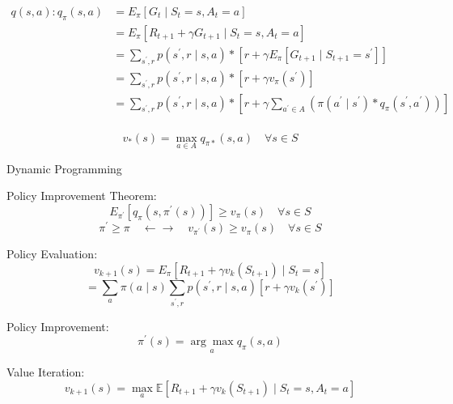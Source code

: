 \documentclass{article}
\begin{document}
\begin{align*}
q(s, a):
q_{\pi}(s, a)&=E_{\pi} \left[G_{t} \mid S_{t}=s, A_{t}=a\right] \\
&=E_{\pi} \left[R_{t+1}+\gamma G_{t+1} \mid S_{t}=s, A_{t}=a\right] \\
&=\sum_{s^{\prime}, r} p\left(s^{\prime}, r \mid s, a\right) * 
\left[r+\gamma E_{\pi} \left[G_{t+1} \mid S_{t+1}=s^{\prime}\right]\right] \\
&=\sum_{s^{\prime}, r} p\left(s^{\prime}, r \mid s, a\right) * 
\left[r+\gamma v_{\pi}\left(s^{\prime}\right)\right] \\
&=\sum_{s^{\prime}, r} p\left(s^{\prime}, r \mid s, a\right) * 
\left[r+\gamma \sum_{a^{\prime} \in A} \left(\pi\left(a^{\prime} \mid s^{\prime}\right) * 
q_{\pi}\left(s^{\prime}, a^{\prime}\right)\right)\right] \\
\end{align*}

$$v_{*}(s)=\max_{a \in A} q_{\pi *}(s, a) \quad \forall s \in S$$


\newpage
Dynamic Programming

Policy Improvement Theorem:
$$E_{\pi^{\prime}} \left[q_{\pi}\left(s, \pi^{\prime}(s)\right)\right] \geq v_{\pi}(s) \quad \forall s \in S$$
$$\pi^{\prime} \geq \pi \quad \leftarrow \rightarrow \quad v_{\pi^{\prime}}(s) \geq v_{\pi}(s) \quad \forall s \in S$$

Policy Evaluation:
$$v_{k+1}(s)={E}_{\pi} \left[R_{t+1}+\gamma v_{k}\left(S_{t+1}\right) \mid S_{t}=s\right]$$
$$=\sum_{a} \pi(a \mid s) \sum_{s^{\prime}, r} 
p\left(s^{\prime}, r \mid s, a\right)\left[r+\gamma v_{k}\left(s^{\prime}\right)\right]$$

Policy Improvement:
$$\pi^{\prime}(s)=\underset{a}{\arg \max} q_{\pi}(s, a)$$

Value Iteration:
$$v_{k+1}(s)=\max_{a} \mathbb{E} \left[R_{t+1}+\gamma v_{k}\left(S_{t+1}\right) \mid S_{t}=s, A_{t}=a\right]$$
\end{document}
